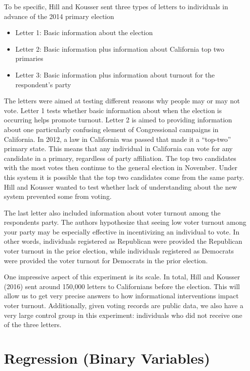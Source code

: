 \documentclass[
]{book}
\providecommand{\tightlist}{%
  \setlength{\itemsep}{0pt}\setlength{\parskip}{0pt}}
\begin{document}
To be specific, Hill and Kousser sent three types of letters to individuals in advance of the 2014 primary election

\begin{itemize}
\tightlist
\item
  Letter 1: Basic information about the election
\item
  Letter 2: Basic information plus information about California top two primaries
\item
  Letter 3: Basic information plus information about turnout for the respondent's party
\end{itemize}

The letters were aimed at testing different reasons why people may or may not vote. Letter 1 tests whether basic information about when the election is occurring helps promote turnout. Letter 2 is aimed to providing information about one particularly confusing element of Congressional campaigns in California. In 2012, a law in California was passed that made it a ``top-two'' primary state. This means that any individual in California can vote for any candidate in a primary, regardless of party affiliation. The top two candidates with the most votes then continue to the general election in November. Under this system it is possible that the top two candidates come from the same party. Hill and Kousser wanted to test whether lack of understanding about the new system prevented some from voting.

The last letter also included information about voter turnout among the respondents party. The authors hypothesize that seeing low voter turnout among your party may be especially effective in incentivizing an individual to vote. In other words, individuals registered as Republican were provided the Republican voter turnout in the prior election, while individuals registered as Democrats were provided the voter turnout for Democrats in the prior election.

One impressive aspect of this experiment is its scale. In total, Hill and Kousser (2016) sent around 150,000 letters to Californians before the election. This will allow us to get very precise answers to how informational interventions impact voter turnout. Additionally, given voting records are public data, we also have a very large control group in this experiment: individuals who did not receive one of the three letters.

\section{Regression (Binary Variables)}\label{regression-binary-variables}
\end{document}
